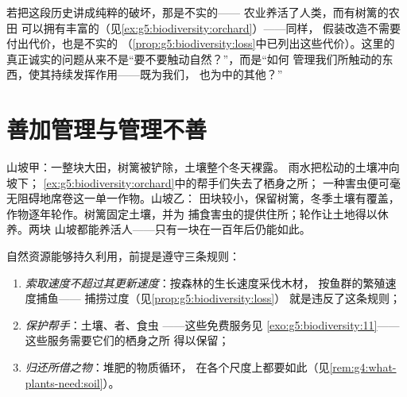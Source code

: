 \begin{remark}\label{rem:g5:people-and-nature:honest}
若把这段历史讲成纯粹的破坏，那是不实的——
农业养活了人类，而有树篱的农田
可以拥有丰富的（见\cref{ex:g5:biodiversity:orchard}）——同样，
假装改造不需要付出代价，也是不实的
（\cref{prop:g5:biodiversity:loss}中已列出这些代价）。这里的
真正诚实的问题从来不是“要不要触动自然？”，而是“如何
管理我们所触动的东西，使其持续发挥作用——既为我们，
也为中的其他？”
\end{remark}

\section{善加管理与管理不善}

\begin{example}[山坡耕作的两种方式]\label{ex:g5:people-and-nature:twofarms}
山坡甲：一整块大田，树篱被铲除，土壤整个冬天裸露。
雨水把松动的土壤冲向坡下；
\cref{ex:g5:biodiversity:orchard}中的帮手们失去了栖身之所；
一种害虫便可毫无阻碍地席卷这一单一作物。山坡乙：
田块较小，保留树篱，冬季土壤有覆盖，
作物逐年轮作。树篱固定土壤，并为
捕食害虫的提供住所；轮作让土地得以休养。两块
山坡都能养活人——只有一块在一百年后仍能如此。
\end{example}

\begin{proposition}[持久利用的三条规则]\label{prop:g5:people-and-nature:lasting}
自然资源能够持久利用，前提是遵守三条规则：
\begin{enumerate}
  \item \emph{索取速度不超过其更新速度}：按森林的生长速度采伐木材，
        按鱼群的繁殖速度捕鱼——
        捕捞过度（见\cref{prop:g5:biodiversity:loss}）
        就是违反了这条规则；
  \item \emph{保护帮手}：土壤、者、食虫
        ——这些免费服务见
        \cref{exo:g5:biodiversity:11}——这些服务需要它们的栖身之所
        得以保留；
  \item \emph{归还所借之物}：堆肥的物质循环，
        在各个尺度上都要如此（见\cref{rem:g4:what-plants-need:soil}）。
\end{enumerate}
\end{proposition}
\admitted

